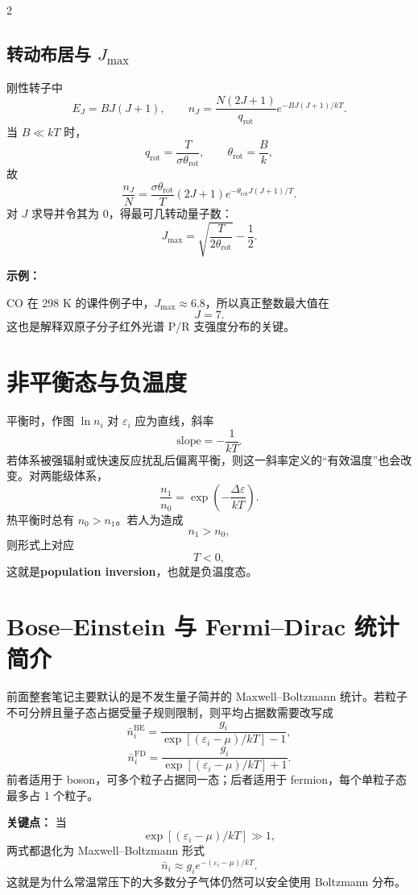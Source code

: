 \documentclass[a4paper,9pt]{article}
\newenvironment{keypoint}
{\par\vspace{0.3em}\noindent\begin{tcolorbox}[colback=keybg,colframe=keycolor,boxrule=0.5pt,arc=2pt,left=2pt,right=2pt,top=2pt,bottom=2pt,boxsep=0pt]\noindent\textcolor{keycolor}{\textbf{关键点：}}}
{\end{tcolorbox}\par\vspace{0.3em}}
\newenvironment{examplebox}
{\par\vspace{0.3em}\noindent\begin{tcolorbox}[colback=boxbg,colframe=derivcolor,boxrule=0.5pt,arc=2pt,left=2pt,right=2pt,top=2pt,bottom=2pt,boxsep=0pt]\scriptsize\noindent\textcolor{derivcolor}{\textbf{示例：}}\par\setlength{\parskip}{0.1ex}\setlength{\itemsep}{0pt}\setlength{\parsep}{0pt}}
{\end{tcolorbox}\par\vspace{0.3em}}
\begin{document}
\begin{multicols}{2}
\subsection{转动布居与 $J_{\max}$}
刚性转子中
\[
E_J=BJ(J+1),
\qquad
n_J=\frac{N(2J+1)}{q_{\mathrm{rot}}}e^{-BJ(J+1)/kT}.
\]
当 $B\ll kT$ 时，
\[
q_{\mathrm{rot}}=\frac{T}{\sigma\theta_{\mathrm{rot}}},
\qquad
\theta_{\mathrm{rot}}=\frac{B}{k},
\]
故
\[
\frac{n_J}{N}=\frac{\sigma\theta_{\mathrm{rot}}}{T}(2J+1)
e^{-\theta_{\mathrm{rot}}J(J+1)/T}.
\]
对 $J$ 求导并令其为 0，得最可几转动量子数：
\[
J_{\max}=\sqrt{\frac{T}{2\theta_{\mathrm{rot}}}}-\frac{1}{2}.
\]

\begin{examplebox}
CO 在 298 K 的课件例子中，$J_{\max}\approx 6.8$，所以真正整数最大值在
\[
J=7.
\]
这也是解释双原子分子红外光谱 P/R 支强度分布的关键。
\end{examplebox}

\section{非平衡态与负温度}

平衡时，作图 $\ln n_i$ 对 $\varepsilon_i$ 应为直线，斜率
\[
\text{slope}=-\frac{1}{kT}.
\]
若体系被强辐射或快速反应扰乱后偏离平衡，则这一斜率定义的“有效温度”也会改变。对两能级体系，
\[
\frac{n_1}{n_0}=\exp\left(-\frac{\Delta\varepsilon}{kT}\right).
\]
热平衡时总有 $n_0>n_1$。若人为造成
\[
n_1>n_0,
\]
则形式上对应
\[
T<0,
\]
这就是\textbf{population inversion}，也就是负温度态。

\section{Bose--Einstein 与 Fermi--Dirac 统计简介}

前面整套笔记主要默认的是不发生量子简并的 Maxwell--Boltzmann 统计。若粒子不可分辨且量子态占据受量子规则限制，则平均占据数需要改写成
\[
\bar n_i^{\mathrm{BE}}=\frac{g_i}{\exp[(\varepsilon_i-\mu)/kT]-1},
\]
\[
\bar n_i^{\mathrm{FD}}=\frac{g_i}{\exp[(\varepsilon_i-\mu)/kT]+1}.
\]
前者适用于 boson，可多个粒子占据同一态；后者适用于 fermion，每个单粒子态最多占 1 个粒子。

\begin{keypoint}
当
\[
\exp[(\varepsilon_i-\mu)/kT]\gg 1,
\]
两式都退化为 Maxwell--Boltzmann 形式
\[
\bar n_i\approx g_i e^{-(\varepsilon_i-\mu)/kT}.
\]
这就是为什么常温常压下的大多数分子气体仍然可以安全使用 Boltzmann 分布。
\end{keypoint}


\end{multicols}
\end{document}
